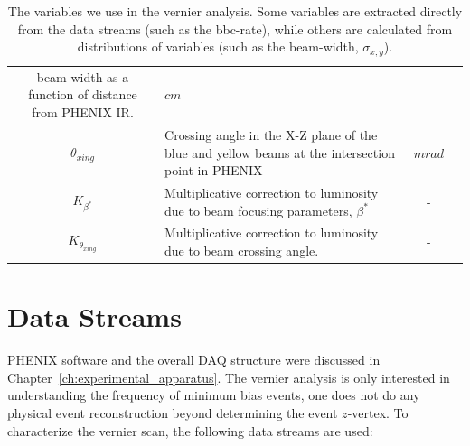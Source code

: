 \begin{table}[ht]
\begin{tabular}{c p{9cm} c c }
    beam width as a function of distance from PHENIX IR. & $cm$ \\
    $\theta_{xing}$ & Crossing angle in the X-Z plane of the blue and yellow
    beams at the intersection point in PHENIX & $mrad$ \\
    $K_{\beta^*}$ & Multiplicative correction to luminosity due to beam focusing
    parameters, $\beta^*$ & - \\
    $K_{\theta_{xing}}$ & Multiplicative correction to luminosity due to beam
    crossing angle.  & - \\
    \bottomrule
  \end{tabular}
  \caption{
    The variables we use in the vernier analysis. Some variables are extracted
    directly from the data streams (such as the bbc-rate), while others are
    calculated from distributions of variables (such as the beam-width,
    $\sigma_{x,y}$). 
  }
  \label{tab:ana_vars}
\end{table}

\section{Data Streams}
\label{ch:DataStreams}

PHENIX software and the overall DAQ structure were discussed in
Chapter~\ref{ch:experimental_apparatus}. The vernier analysis is only interested
in understanding the frequency of minimum bias events, one does not do any
physical event reconstruction beyond determining the event $z$-vertex. To
characterize the vernier scan, the following data streams are used:

